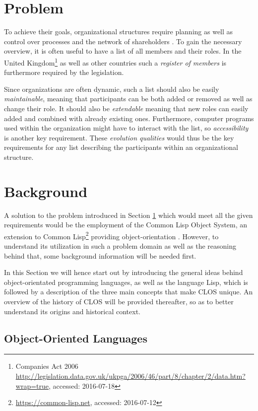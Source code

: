 \documentclass[oribibl]{llncs}
\begin{document}
\section{Problem}
\label{sec:problem}

To achieve their goals, organizational structures require planning as well as control over processes and the network of shareholders \cite[42f.]{Schmidt2000}. To gain the necessary overview, it is often useful to have a list of all members and their roles. In the United Kingdom\footnote{Companies Act 2006 \url{http://legislation.data.gov.uk/ukpga/2006/46/part/8/chapter/2/data.htm?wrap=true}, accessed: 2016-07-18} as well as other countries such a \emph{register of members} is furthermore required by the legislation.

Since organizations are often dynamic, such a list should also be easily \emph{maintainable}, meaning that participants can be both added or removed as well as change their role. It should also be \emph{extendable} meaning that new roles can easily added and combined with already existing ones. Furthermore, computer programs used within the organization might have to interact with the list, so \emph{accessibility} is another key requirement. These \emph{evolution qualities} \cite{young2001effective} would thus be the key requirements for  any list describing the participants within an organizational structure.


\section{Background}
\label{sec:background}
A solution to the problem introduced in Section \ref{sec:problem} which would meet all the given requirements would be the employment of the Common Lisp Object System, an extension to Common Lisp\footnote{\url{https://common-lisp.net}, accessed: 2016-07-12} providing object-orientation \cite{demichiel1987common}. However, to understand its utilization in such a problem domain as well as the reasoning behind that, some background information will be needed first.

In this Section we will hence start out by introducing the general ideas behind object-orientated programming languages, as well as the language Lisp, which is followed by a description of the three main concepts that make CLOS unique. An overview of the history of CLOS will be provided thereafter, so as to better understand its origins and historical context.

\subsection{Object-Oriented Languages}
\label{sec:oo}
\end{document}
